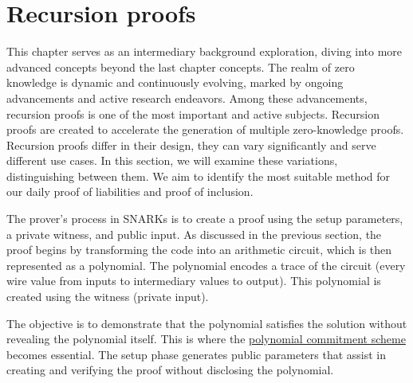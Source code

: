 


\chapter{Recursion proofs}

This chapter serves as an intermediary background exploration, 
diving into more advanced concepts beyond the last chapter concepts.
The realm of zero knowledge is dynamic and continuously evolving,
marked by ongoing advancements and active research endeavors. Among these advancements,
recursion proofs is one of the most important and active subjects. Recursion proofs are created to accelerate
the generation of multiple zero-knowledge proofs.
Recursion proofs differ in their design, they can vary significantly and serve different use cases.
In this section, we will examine these variations, distinguishing between them.
We aim to identify the most suitable method for our daily proof of liabilities and proof of inclusion. \cite{Nova23}


The prover's process in SNARKs is to create a proof using the setup parameters, a private witness, and public input. 
As discussed in the previous section, the proof begins by transforming the code into an arithmetic circuit, 
which is then represented as a polynomial. The polynomial encodes a trace of the circuit (every wire value from inputs to intermediary values to output).
This polynomial is created using the witness (private input).

The objective is to demonstrate that the polynomial satisfies the solution without revealing the polynomial itself. 
This is where the \hyperref[subsec:pc]{polynomial commitment scheme} becomes essential. 
The setup phase generates public parameters that assist in creating and verifying the proof without disclosing the polynomial.

